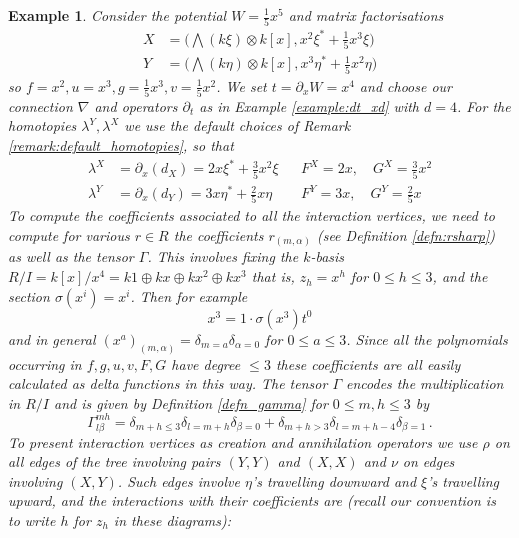 \documentclass[english,letter paper,12pt,leqno]{article}
\theoremstyle{example}
\newtheorem{example}[theorem]{Example}
\numberwithin{equation}{section}
\begin{document}
\begin{example} Consider the potential $W = \frac{1}{5} x^5$ and matrix factorisations
\begin{align}
X &= \big( \bigwedge(k \xi) \otimes k[x], x^2 \xi^* + \frac{1}{5} x^3 \xi \big)\\
Y &= \big( \bigwedge(k \eta) \otimes k[x], x^3 \eta^* + \frac{1}{5} x^2 \eta \big)
\end{align}
so $f = x^2, u = x^3, g = \frac{1}{5}x^3, v = \frac{1}{5} x^2$. We set $t = \partial_x W = x^4$ and choose our connection $\nabla$ and operators $\partial_t$ as in Example \ref{example:dt_xd} with $d = 4$. For the homotopies $\lambda^Y, \lambda^X$ we use the default choices of Remark \ref{remark:default_homotopies}, so that
\begin{align*}
\lambda^X &= \partial_x( d_X ) = 2 x \xi^* + \frac{3}{5} x^2 \xi && F^X = 2x, \quad G^X = \frac{3}{5} x^2\\
\lambda^Y &= \partial_x( d_Y ) = 3 x \eta^* + \frac{2}{5} x \eta && F^Y = 3x, \quad G^Y = \frac{2}{5} x
\end{align*}
To compute the coefficients associated to all the interaction vertices, we need to compute for various $r \in R$ the coefficients $r_{(m,\alpha)}$ (see Definition \ref{defn:rsharp}) as well as the tensor $\Gamma$. This involves fixing the $k$-basis $R/I = k[x]/x^4 = k1 \oplus kx \oplus kx^2 \oplus kx^3$ that is, $z_h = x^h$ for $0 \le h \le 3$, and the section $\sigma(x^i) = x^i$. Then for example
\[
x^3 = 1 \cdot \sigma( x^3 ) t^0
\]
and in general $(x^a)_{(m,\alpha)} = \delta_{m = a} \delta_{\alpha = 0}$ for $0 \le a \le 3$. Since all the polynomials occurring in $f,g,u,v,F,G$ have degree $\le 3$ these coefficients are all easily calculated as delta functions in this way. The tensor $\Gamma$ encodes the multiplication in $R/I$ and is given by Definition \ref{defn_gamma} for $0 \le m,h \le 3$ by
\[
\Gamma^{mh}_{l \beta} = \delta_{m+h \le 3}\delta_{l = m+h}\delta_{\beta = 0} + \delta_{m+h > 3} \delta_{l = m+h-4} \delta_{\beta = 1}\,.
\]
To present interaction vertices as creation and annihilation operators we use $\rho$ on all edges of the tree involving pairs $(Y,Y)$ and $(X,X)$ and $\nu$ on edges involving $(X,Y)$. Such edges involve $\eta$'s travelling downward and $\xi$'s travelling upward, and the interactions with their coefficients are (recall our convention is to write $h$ for $z_h$ in these diagrams):
\begin{center}
\begin{tabular}{ >{\centering}m{5cm} >{\centering}m{5cm} >{\centering}m{5cm} }

\end{tabular}
\end{center}
\end{example}
\end{document}
